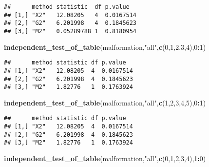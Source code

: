 \documentclass[12pt,hyperref,]{ctexart}
\newenvironment{Shaded}{\begin{snugshade}}{\end{snugshade}}
\newcommand{\DecValTok}[1]{\textcolor[rgb]{0.00,0.00,0.81}{#1}}
\newcommand{\KeywordTok}[1]{\textcolor[rgb]{0.13,0.29,0.53}{\textbf{#1}}}
\newcommand{\NormalTok}[1]{#1}
\newcommand{\OperatorTok}[1]{\textcolor[rgb]{0.81,0.36,0.00}{\textbf{#1}}}
\newcommand{\StringTok}[1]{\textcolor[rgb]{0.31,0.60,0.02}{#1}}
\begin{document}
\begin{verbatim}
##      method statistic  df p.value  
## [1,] "X2"   12.08205   4  0.0167514
## [2,] "G2"   6.201998   4  0.1845623
## [3,] "M2"   0.05289788 1  0.8180954
\end{verbatim}

\begin{Shaded}
\begin{Highlighting}[]
\KeywordTok{independent_test_of_table}\NormalTok{(malformation,}\StringTok{"all"}\NormalTok{,}\KeywordTok{c}\NormalTok{(}\DecValTok{0}\NormalTok{,}\DecValTok{1}\NormalTok{,}\DecValTok{2}\NormalTok{,}\DecValTok{3}\NormalTok{,}\DecValTok{4}\NormalTok{),}\DecValTok{0}\OperatorTok{:}\DecValTok{1}\NormalTok{)}
\end{Highlighting}
\end{Shaded}

\begin{verbatim}
##      method statistic df p.value  
## [1,] "X2"   12.08205  4  0.0167514
## [2,] "G2"   6.201998  4  0.1845623
## [3,] "M2"   1.82776   1  0.1763924
\end{verbatim}

\begin{Shaded}
\begin{Highlighting}[]
\KeywordTok{independent_test_of_table}\NormalTok{(malformation,}\StringTok{"all"}\NormalTok{,}\KeywordTok{c}\NormalTok{(}\DecValTok{1}\NormalTok{,}\DecValTok{2}\NormalTok{,}\DecValTok{3}\NormalTok{,}\DecValTok{4}\NormalTok{,}\DecValTok{5}\NormalTok{),}\DecValTok{0}\OperatorTok{:}\DecValTok{1}\NormalTok{)}
\end{Highlighting}
\end{Shaded}

\begin{verbatim}
##      method statistic df p.value  
## [1,] "X2"   12.08205  4  0.0167514
## [2,] "G2"   6.201998  4  0.1845623
## [3,] "M2"   1.82776   1  0.1763924
\end{verbatim}

\begin{Shaded}
\begin{Highlighting}[]
\KeywordTok{independent_test_of_table}\NormalTok{(malformation,}\StringTok{"all"}\NormalTok{,}\KeywordTok{c}\NormalTok{(}\DecValTok{0}\NormalTok{,}\DecValTok{1}\NormalTok{,}\DecValTok{2}\NormalTok{,}\DecValTok{3}\NormalTok{,}\DecValTok{4}\NormalTok{),}\DecValTok{1}\OperatorTok{:}\DecValTok{0}\NormalTok{)}
\end{Highlighting}
\end{Shaded}
\end{document}
